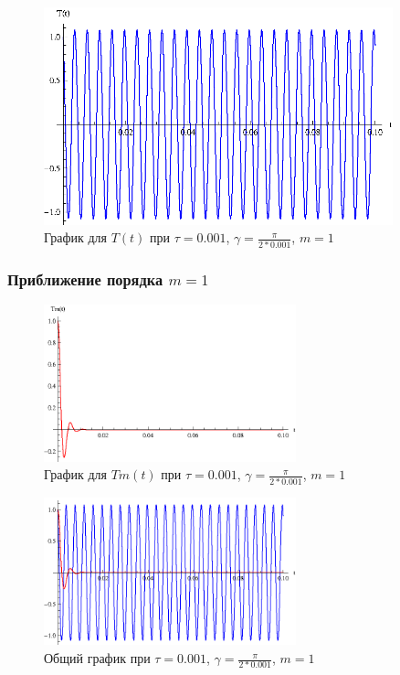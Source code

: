 \vfill

\begin{figure}[h]
\begin{center}
\includegraphics[width=0.9\textwidth]{./3_results/5_1.eps}
\end{center}
\caption{График для $T(t)$ при $\tau=0.001$, $\gamma = \frac{\pi}{2*0.001}$, $m=1$}
\end{figure}

\vfill

\newpage

\subsubsection{Приближение порядка $m=1$}

\begin{figure}[h]
\begin{center}
\includegraphics[width=0.65\textwidth]{./3_results/5_2.eps}
\end{center}
\caption{График для $Tm(t)$ при $\tau=0.001$, $\gamma = \frac{\pi}{2*0.001}$, $m=1$}
\end{figure}

\begin{figure}[h]
\begin{center}
\includegraphics[width=0.65\textwidth]{./3_results/5_3.eps}
\end{center}
\caption{Общий график при $\tau=0.001$, $\gamma = \frac{\pi}{2*0.001}$, $m=1$}
\end{figure}

